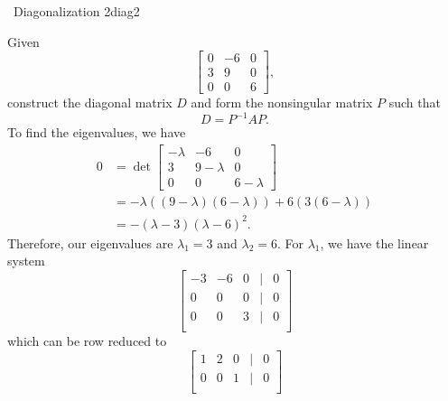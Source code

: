         \begin{example}{\Difficulty\,\Difficulty\,\,Diagonalization 2}{diag2}

            Given
            \begin{equation*}
                \begin{bmatrix}
                    0 & -6 & 0 \\
                    3 & 9 & 0 \\
                    0 & 0 & 6
                \end{bmatrix},
            \end{equation*}
            construct the diagonal matrix \(D\) and form the nonsingular matrix \(P\) such that
            \begin{equation*}
                D=P^{-1}AP.
            \end{equation*}
            To find the eigenvalues, we have
            \begin{align*}
                0&=\det\begin{bmatrix}
                    -\lambda & -6 & 0 \\
                    3 & 9-\lambda & 0 \\
                    0 & 0 & 6-\lambda
                \end{bmatrix} \\
                &=-\lambda((9-\lambda)(6-\lambda))+6(3(6-\lambda)) \\
                &=-(\lambda-3)(\lambda-6)^2.
            \end{align*}
            Therefore, our eigenvalues are \(\lambda_1=3\) and \(\lambda_2=6\). For \(\lambda_1\), we have the linear system
            \begin{equation*}
                \begin{bmatrix}
                    -3 & -6 & 0 & | & 0 \\
                    0 & 0 & 0 & | & 0 \\
                    0 & 0 & 3 & | & 0 \\
                \end{bmatrix}
            \end{equation*}
            which can be row reduced to
            \begin{equation*}
                \begin{bmatrix}
                    1 & 2 & 0 & | & 0 \\
                    0 & 0 & 1 & | & 0 \\

\end{bmatrix}
\end{equation*}
\end{example}
